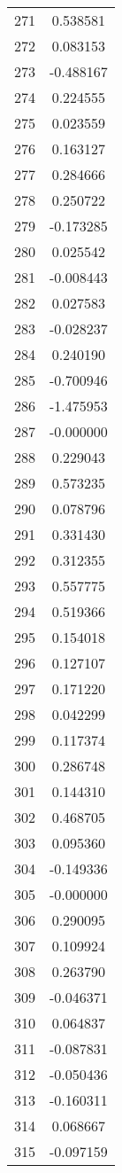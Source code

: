 \documentclass[12pt]{article}
\begin{document}
\begin{longtable}{@{}cc@{}}
271 & 0.538581 \\
272 & 0.083153 \\
273 & -0.488167 \\
274 & 0.224555 \\
275 & 0.023559 \\
276 & 0.163127 \\
277 & 0.284666 \\
278 & 0.250722 \\
279 & -0.173285 \\
280 & 0.025542 \\
281 & -0.008443 \\
282 & 0.027583 \\
283 & -0.028237 \\
284 & 0.240190 \\
285 & -0.700946 \\
286 & -1.475953 \\
287 & -0.000000 \\
288 & 0.229043 \\
289 & 0.573235 \\
290 & 0.078796 \\
291 & 0.331430 \\
292 & 0.312355 \\
293 & 0.557775 \\
294 & 0.519366 \\
295 & 0.154018 \\
296 & 0.127107 \\
297 & 0.171220 \\
298 & 0.042299 \\
299 & 0.117374 \\
300 & 0.286748 \\
301 & 0.144310 \\
302 & 0.468705 \\
303 & 0.095360 \\
304 & -0.149336 \\
305 & -0.000000 \\
306 & 0.290095 \\
307 & 0.109924 \\
308 & 0.263790 \\
309 & -0.046371 \\
310 & 0.064837 \\
311 & -0.087831 \\
312 & -0.050436 \\
313 & -0.160311 \\
314 & 0.068667 \\
315 & -0.097159 \\

\end{longtable}
\end{document}
